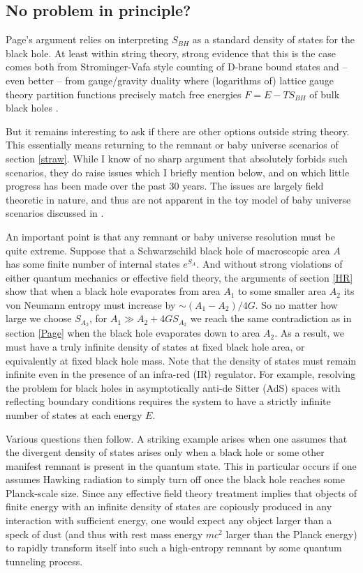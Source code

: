\documentclass[12pt]{article}
\begin{document}
\subsection{No problem in principle?}
  \label{InfoLoss}
  Page's argument relies on interpreting $S_{BH}$ as a standard density of states for the black hole.  At least within string theory, strong evidence that this is the case comes both from Strominger-Vafa style counting of D-brane bound states \cite{Strominger:1996sh} and -- even better -- from gauge/gravity duality where (logarithms of) lattice gauge theory partition functions precisely match free energies $F =  E-TS_{BH}$ of bulk black holes \cite{Hanada:2008ez,Hanada:2012eg,Hanada:2014hpa}.

But it remains interesting to ask if there are other options outside string theory.  This essentially means returning to the remnant or baby universe scenarios of section \ref{straw}. While I know of no sharp argument that absolutely forbids such scenarios, they do raise issues which I briefly mention below, and on which little progress has been made over the past 30 years.  The issues are largely field theoretic in nature, and thus are not apparent in the toy model of baby universe scenarios discussed in \cite{Unruh:2012vd}.

An important point is that any remnant or baby universe resolution must be quite extreme.  Suppose that a Schwarzschild black hole of macroscopic area $A$ has some finite number of internal states $e^{S_{A}}$.  And without strong violations of either quantum mechanics or effective field theory, the arguments of section \eqref{HR} show that when a black hole evaporates from area $A_1$ to some smaller area $A_2$ its von Neumann entropy must increase by $\sim (A_1 - A_2)/4G$.  So no matter how large we choose $S_{A_2}$, for $A_1 \gg A_2 + 4GS_{A_2}$ we reach the same contradiction as in section \ref{Page} when the black hole evaporates down to area $A_2$.  As a result, we must have a truly infinite density of states at fixed black hole area, or equivalently at fixed black hole mass.  Note that the density of states must remain infinite even in the presence of an infra-red (IR) regulator.  For example, resolving the problem for black holes in asymptotically anti-de Sitter (AdS) spaces with reflecting boundary conditions requires the system to have a strictly infinite number of states at each energy $E$.

Various questions then follow.  A striking example \cite{Giddings:1993km} arises when one assumes that the divergent density of states arises only when a black hole or some other manifest remnant is present in the quantum state.  This in particular occurs if one assumes Hawking radiation to simply turn off once the black hole reaches some Planck-scale size.  Since any effective field theory treatment implies that objects of finite energy with an infinite density of states are copiously produced in any interaction with sufficient energy, one would expect any object larger than a speck of dust (and thus with rest mass energy $mc^2$ larger than the Planck energy) to rapidly transform itself into such a high-entropy remnant by some quantum tunneling process.
\end{document}
